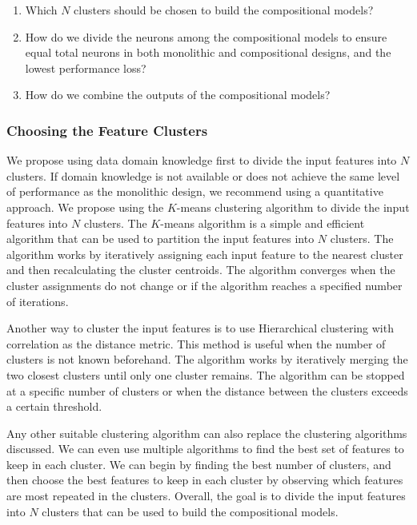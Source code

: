 \begin{enumerate}
    \item Which $N$ clusters should be chosen to build the compositional models?
    \item How do we divide the neurons among the compositional models to ensure equal total neurons in both monolithic and compositional designs, and the lowest performance loss?
    \item How do we combine the outputs of the compositional models?
\end{enumerate}

\subsubsection{Choosing the Feature Clusters}

We propose using data domain knowledge first to divide the input features into $N$ clusters. If domain knowledge is not available or does not achieve the same level of performance as the monolithic design, we recommend using a quantitative approach. We propose using the $K$-means clustering algorithm \cite{10.5555/1283383.1283494} to divide the input features into $N$ clusters. The $K$-means algorithm is a simple and efficient algorithm that can be used to partition the input features into $N$ clusters. The algorithm works by iteratively assigning each input feature to the nearest cluster and then recalculating the cluster centroids. The algorithm converges when the cluster assignments do not change or if the algorithm reaches a specified number of iterations.

Another way to cluster the input features is to use Hierarchical clustering with correlation as the distance metric. This method is useful when the number of clusters is not known beforehand. The algorithm works by iteratively merging the two closest clusters until only one cluster remains. The algorithm can be stopped at a specific number of clusters or when the distance between the clusters exceeds a certain threshold. 

Any other suitable clustering algorithm can also replace the clustering algorithms discussed. We can even use multiple algorithms to find the best set of features to keep in each cluster. We can begin by finding the best number of clusters, and then choose the best features to keep in each cluster by observing which features are most repeated in the clusters. Overall, the goal is to divide the input features into $N$ clusters that can be used to build the compositional models.


